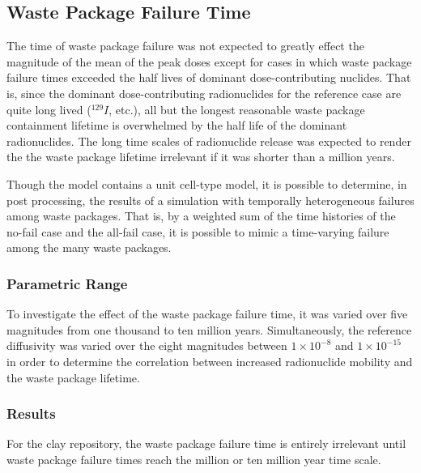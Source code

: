 
\subsection{Waste Package Failure Time}

The time of waste package failure was not expected to greatly effect the 
magnitude of the mean of the peak doses except for cases in which waste package failure times 
exceeded the half lives of dominant dose-contributing nuclides. 
That is, since the dominant dose-contributing 
radionuclides for the reference case are quite long lived ($^{129}I$, etc.), 
all but the longest reasonable waste package containment lifetime is overwhelmed by 
the half life of the dominant radionuclides. The long time scales of 
radionuclide release was expected to render the the waste package lifetime 
irrelevant if it was shorter than a million years. 

Though the model contains a unit cell-type model, it is possible to determine, 
in post processing, the results of a simulation with temporally heterogeneous 
failures among waste packages. That is, by a weighted sum of the time histories 
of the no-fail case and the all-fail case, it is possible to mimic a 
time-varying failure among the many waste packages. 

\subsubsection{Parametric Range}

To investigate the effect of the waste package failure time, it was varied over 
five magnitudes from one thousand to ten million years. Simultaneously, the reference 
diffusivity was varied over the eight magnitudes between $1\times10^{-8}$ and 
$1\times10^{-15}$ in order to determine the correlation between increased 
radionuclide mobility and the waste package lifetime. 

\subsubsection{Results}

For the clay repository, the waste package failure time is entirely irrelevant 
until waste package failure times reach the million or ten million year time 
scale. 

